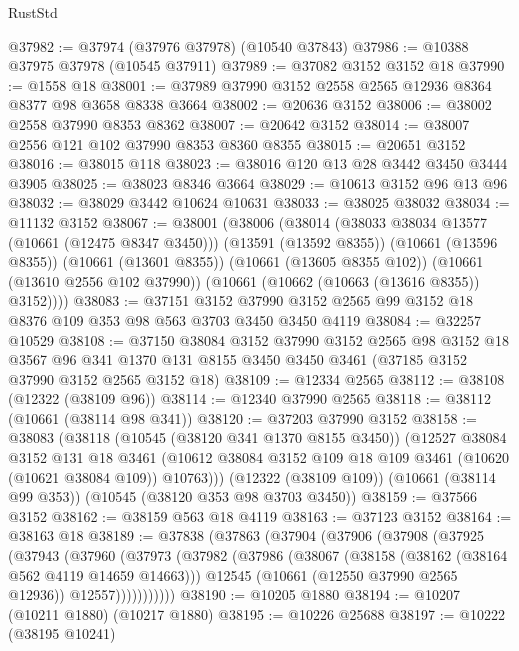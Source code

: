 \begin{lexlean}{RustStd}
\begin{coremodule}
@37982 := @37974 (@37976 @37978) (@10540 @37843)
@37986 := @10388 @37975 @37978 (@10545 @37911)
@37989 := @37082 @3152 @3152 @18
@37990 := @1558 @18
@38001 := @37989 @37990 @3152 @2558 @2565 @12936 @8364 @8377 @98 @3658 @8338 @3664
@38002 := @20636 @3152
@38006 := @38002 @2558 @37990 @8353 @8362
@38007 := @20642 @3152
@38014 := @38007 @2556 @121 @102 @37990 @8353 @8360 @8355
@38015 := @20651 @3152
@38016 := @38015 @118
@38023 := @38016 @120 @13 @28 @3442 @3450 @3444 @3905
@38025 := @38023 @8346 @3664
@38029 := @10613 @3152 @96 @13 @96
@38032 := @38029 @3442 @10624 @10631
@38033 := @38025 @38032
@38034 := @11132 @3152
@38067 := @38001
    (@38006
      (@38014
        (@38033 @38034 @13577 (@10661 (@12475 @8347 @3450)))
        (@13591 (@13592 @8355))
        (@10661 (@13596 @8355))
        (@10661 (@13601 @8355))
        (@10661 (@13605 @8355 @102))
        (@10661 (@13610 @2556 @102 @37990))
        (@10661 (@10662 (@10663 (@13616 @8355)) @3152))))
@38083 := @37151
    @3152
    @37990
    @3152
    @2565
    @99
    @3152
    @18
    @8376
    @109
    @353
    @98
    @563
    @3703
    @3450
    @3450
    @4119
@38084 := @32257 @10529
@38108 := @37150
    @38084
    @3152
    @37990
    @3152
    @2565
    @98
    @3152
    @18
    @3567
    @96
    @341
    @1370
    @131
    @8155
    @3450
    @3450
    @3461
    (@37185 @3152 @37990 @3152 @2565 @3152 @18)
@38109 := @12334 @2565
@38112 := @38108 (@12322 (@38109 @96))
@38114 := @12340 @37990 @2565
@38118 := @38112 (@10661 (@38114 @98 @341))
@38120 := @37203 @37990 @3152
@38158 := @38083
    (@38118
      (@10545 (@38120 @341 @1370 @8155 @3450))
      (@12527
        @38084
        @3152
        @131
        @18
        @3461
        (@10612 @38084 @3152 @109 @18 @109 @3461 (@10620 (@10621 @38084 @109)) @10763)))
    (@12322 (@38109 @109))
    (@10661 (@38114 @99 @353))
    (@10545 (@38120 @353 @98 @3703 @3450))
@38159 := @37566 @3152
@38162 := @38159 @563 @18 @4119
@38163 := @37123 @3152
@38164 := @38163 @18
@38189 := @37838
    (@37863
      (@37904
        (@37906
          (@37908
            (@37925
              (@37943
                (@37960
                  (@37973
                    (@37982
                      (@37986
                        (@38067
                          (@38158 (@38162 (@38164 @562 @4119 @14659 @14663)))
                          @12545
                          (@10661 (@12550 @37990 @2565 @12936))
                          @12557)))))))))))
@38190 := @10205 @1880
@38194 := @10207 (@10211 @1880) (@10217 @1880)
@38195 := @10226 @25688
@38197 := @10222 (@38195 @10241)

\end{coremodule}
\end{lexlean}
